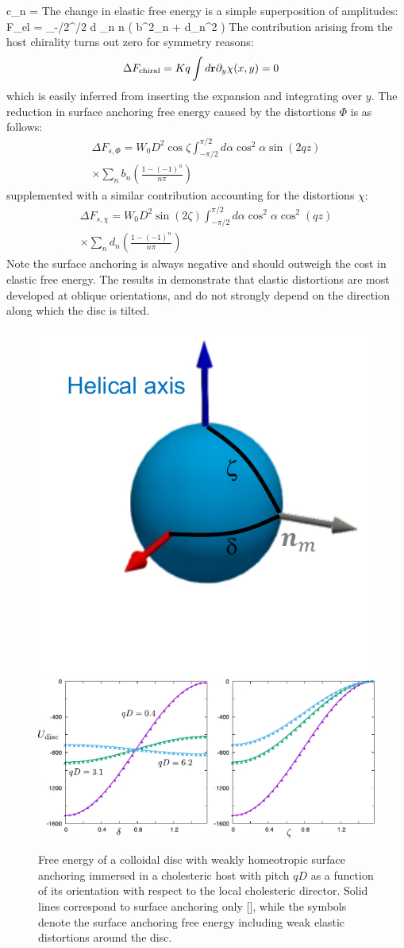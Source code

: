 \beq
c_{n} = 
\eeq
The change in elastic free energy is a simple superposition of amplitudes:
\beq
\Delta F_{el} =   \int_{-\pi/2}^{\pi/2} d \alpha \cos \alpha \sum_{n} n \left ( b^{2}_{n} + d_{n}^{2} \right )
\eeq
The contribution arising from the host chirality turns out zero for symmetry reasons:
\begin{align}
 \Delta F_{\rm chiral} &=  K q \int d {\bf r} \partial_{y} \chi (x,y) =0
\end{align}
which is easily inferred from inserting the expansion  and integrating over $y$.
The reduction in surface anchoring free energy caused by the distortions  $\Phi$ is as follows:
\begin{align}
\Delta F_{s, \Phi} = W_{0}D^{2} \cos \zeta  \int_{-\pi/2}^{\pi/2} d \alpha \cos^{2} \alpha \sin (2 qz) \nonumber \\
\times \sum_{n} b_{n} \left ( \frac{1-(-1)^{n}}{n \pi}\right )
\end{align}
supplemented with a similar contribution accounting for the distortions $\chi$:
\begin{align}
\Delta F_{s, \chi} = W_{0}D^{2} \sin( 2 \zeta ) \int_{-\pi/2}^{\pi/2} d \alpha \cos^{2} \alpha  \cos^{2} (qz) \nonumber \\
\times \sum_{n} d_{n} \left ( \frac{1-(-1)^{n}}{n \pi}\right )
\end{align}
Note the surface anchoring is always negative and should outweigh the cost in elastic free energy. The results in  demonstrate that elastic distortions are most developed at oblique orientations, and do not strongly depend on the direction along which the disc is tilted.

\begin{figure}
\includegraphics[width = 0.25 \columnwidth]{figures/chapter-3/deldisc}
	\includegraphics[width = 0.7 \columnwidth]{figures/chapter-3/udisc}
	\caption{Free energy of a colloidal disc with weakly homeotropic surface anchoring immersed in a cholesteric host with pitch $qD$ as a function of its orientation with respect to the local cholesteric director.  Solid lines correspond to surface anchoring only  [], while the symbols denote the surface anchoring free energy including weak elastic distortions around the disc.  }
	\label{udisc}
\end{figure}

